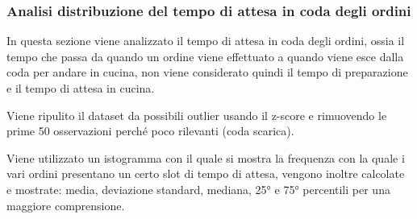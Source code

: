 \subsubsection{Analisi distribuzione del tempo di attesa in coda degli ordini}
In questa sezione viene analizzato il tempo di attesa in coda degli ordini, ossia il tempo che passa da quando un ordine viene effettuato a quando viene esce dalla coda per andare in cucina, non viene considerato quindi il tempo di preparazione e il tempo di attesa in cucina.

Viene ripulito il dataset da possibili outlier usando il z-score e rimuovendo le prime 50 osservazioni perché poco rilevanti (coda scarica).

Viene utilizzato un istogramma con il quale si mostra la frequenza con la quale i vari ordini presentano un certo slot di tempo di attesa, vengono inoltre calcolate e mostrate: media, deviazione standard, mediana, 25° e 75° percentili per una maggiore comprensione.

